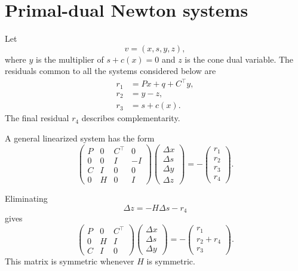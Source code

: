 \documentclass[a4paper,11pt]{book}
\theoremstyle{plain}
\theoremstyle{definition}
\theoremstyle{remark}
\numberwithin{equation}{chapter}
\numberwithin{algorithm}{chapter}
\begin{document}
	\section{Primal-dual Newton systems}
	
	Let
	\[
	v=(x,s,y,z),
	\]
	where \(y\) is the multiplier of \(s+c(x)=0\) and \(z\) is the cone dual
	variable. The residuals common to all the systems considered below are
	\begin{align}
		r_1&=Px+q+C^\top y,\\
		r_2&=y-z,\\
		r_3&=s+c(x).
	\end{align}
	The final residual \(r_4\) describes complementarity.
	
	A general linearized system has the form
	\begin{equation}
		\begin{pmatrix}
			P & 0 & C^\top & 0\\
			0 & 0 & I      & -I\\
			C & I & 0      & 0\\
			0 & H & 0      & I
		\end{pmatrix}
		\begin{pmatrix}
			\Delta x\\
			\Delta s\\
			\Delta y\\
			\Delta z
		\end{pmatrix}
		=
		-
		\begin{pmatrix}
			r_1\\
			r_2\\
			r_3\\
			r_4
		\end{pmatrix}.
		\label{eq:general-primal-dual-system}
	\end{equation}
	
	Eliminating
	\[
	\Delta z=-H\Delta s-r_4
	\]
	gives
	\begin{equation}
		\begin{pmatrix}
			P & 0 & C^\top\\
			0 & H & I\\
			C & I & 0
		\end{pmatrix}
		\begin{pmatrix}
			\Delta x\\
			\Delta s\\
			\Delta y
		\end{pmatrix}
		=
		-
		\begin{pmatrix}
			r_1\\
			r_2+r_4\\
			r_3
		\end{pmatrix}.
		\label{eq:three-by-three-primal-dual-system}
	\end{equation}
	This matrix is symmetric whenever \(H\) is symmetric.
	
\end{document}
